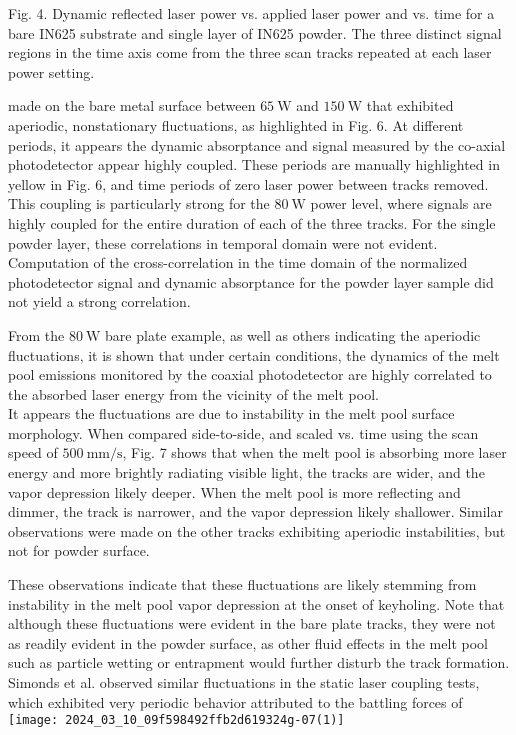 \documentclass[10pt]{article}
\begin{document}
Fig. 4. Dynamic reflected laser power vs. applied laser power and vs. time for a bare IN625 substrate and single layer of IN625 powder. The three distinct signal regions in the time axis come from the three scan tracks repeated at each laser power setting.

made on the bare metal surface between $65 \mathrm{~W}$ and $150 \mathrm{~W}$ that exhibited aperiodic, nonstationary fluctuations, as highlighted in Fig. 6. At different periods, it appears the dynamic absorptance and signal measured by the co-axial photodetector appear highly coupled. These periods are manually highlighted in yellow in Fig. 6, and time periods of zero laser power between tracks removed. This coupling is particularly strong for the $80 \mathrm{~W}$ power level, where signals are highly coupled for the entire duration of each of the three tracks. For the single powder layer, these correlations in temporal domain were not evident. Computation of the cross-correlation in the time domain of the normalized photodetector signal and dynamic absorptance for the powder layer sample did not yield a strong correlation.

From the $80 \mathrm{~W}$ bare plate example, as well as others indicating the aperiodic fluctuations, it is shown that under certain conditions, the dynamics of the melt pool emissions monitored by the coaxial photodetector are highly correlated to the absorbed laser energy from the vicinity of the melt pool.\\
It appears the fluctuations are due to instability in the melt pool surface morphology. When compared side-to-side, and scaled vs. time using the scan speed of $500 \mathrm{~mm} / \mathrm{s}$, Fig. 7 shows that when the melt pool is absorbing more laser energy and more brightly radiating visible light, the tracks are wider, and the vapor depression likely deeper. When the melt pool is more reflecting and dimmer, the track is narrower, and the vapor depression likely shallower. Similar observations were made on the other tracks exhibiting aperiodic instabilities, but not for powder surface.

These observations indicate that these fluctuations are likely stemming from instability in the melt pool vapor depression at the onset of keyholing. Note that although these fluctuations were evident in the bare plate tracks, they were not as readily evident in the powder surface, as other fluid effects in the melt pool such as particle wetting or entrapment would further disturb the track formation. Simonds et al. observed similar fluctuations in the static laser coupling tests, which exhibited very periodic behavior attributed to the battling forces of\\
\texttt{[image: 2024\_03\_10\_09f598492ffb2d619324g-07(1)]}
\end{document}
